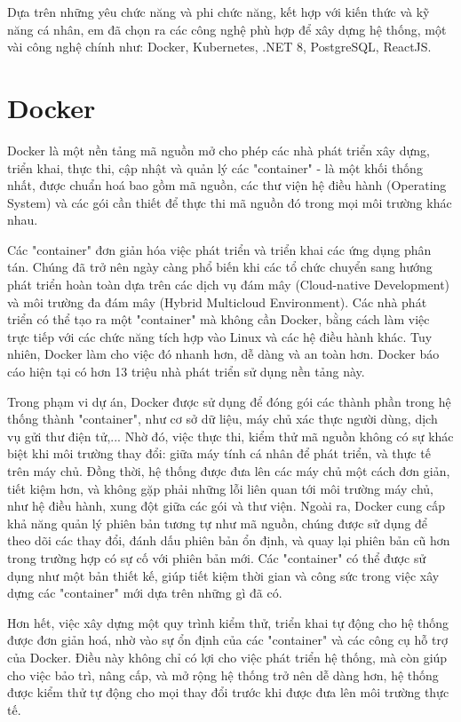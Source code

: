 \documentclass[../DoAn.tex]{subfiles}
\begin{document}
Dựa trên những yêu chức năng và phi chức năng, kết hợp với kiến thức và kỹ năng cá nhân, em đã chọn ra các công nghệ phù hợp để xây dựng hệ thống, một vài công nghệ chính như: Docker,
Kubernetes, .NET 8, PostgreSQL, ReactJS.

\section{Docker}
\label{section:3.1}
Docker là một nền tảng mã nguồn mở cho phép các nhà phát triển xây dựng, triển khai, thực thi, cập nhật và quản lý các "container" -
là một khối thống nhất, được chuẩn hoá bao gồm mã nguồn, các thư viện hệ điều hành (Operating System) và các gói cần thiết để thực thi
mã nguồn đó trong mọi môi trường khác nhau.\cite{DockerOverview}

Các "container" đơn giản hóa việc phát triển và triển khai các ứng dụng phân tán. Chúng đã trở nên ngày càng phổ biến khi các tổ chức chuyển sang hướng phát triển hoàn toàn dựa trên
các dịch vụ đám mây (Cloud-native Development) và môi trường đa đám mây (Hybrid Multicloud Environment).
Các nhà phát triển có thể tạo ra một "container" mà không cần Docker, bằng cách làm việc trực tiếp với các chức năng tích hợp vào Linux và các hệ điều hành khác.
Tuy nhiên, Docker làm cho việc đó nhanh hơn, dễ dàng và an toàn hơn. Docker báo cáo hiện tại có hơn 13 triệu nhà phát triển sử dụng nền tảng này.\cite{DockerIBM}

Trong phạm vi dự án, Docker được sử dụng để đóng gói các thành phần trong hệ thống thành "container", như cơ sở dữ liệu, máy chủ xác thực người dùng, dịch vụ gửi thư điện tử,...
Nhờ đó, việc thực thi, kiểm thử mã nguồn không có sự khác biệt khi môi trường thay đổi: giữa máy tính cá nhân để phát triển, và thực tế trên máy chủ.
Đồng thời, hệ thống được đưa lên các máy chủ một cách đơn giản, tiết kiệm hơn, và không gặp phải những lỗi liên quan tới môi trường máy chủ, như hệ điều hành, xung đột giữa các gói và thư viện.
Ngoài ra, Docker cung cấp khả năng quản lý phiên bản tương tự như mã nguồn, chúng được sử dụng để theo dõi các thay đổi, đánh dấu phiên bản ổn định, và quay lại phiên bản cũ hơn
trong trường hợp có sự cố với phiên bản mới. Các "container" có thể được sử dụng như một bản thiết kế, giúp tiết kiệm thời gian và công sức trong việc
xây dựng các "container" mới dựa trên những gì đã có.

Hơn hết, việc xây dựng một quy trình kiểm thử, triển khai tự động cho hệ thống được đơn giản hoá, nhờ vào sự ổn định của các "container" và các công cụ hỗ trợ của Docker.
Điều này không chỉ có lợi cho việc phát triển hệ thống, mà còn giúp cho việc bảo trì, nâng cấp, và mở rộng hệ thống trở nên dễ dàng hơn, hệ thống được kiểm thử tự động cho mọi thay đổi
trước khi được đưa lên môi trường thực tế.
\end{document}
